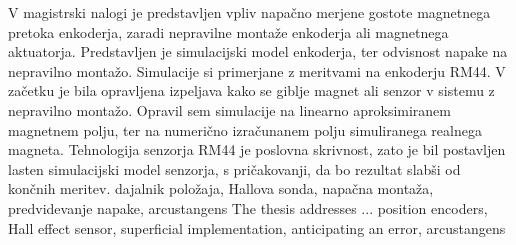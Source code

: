 \documentclass[a4paper,twoside,openright,12pt]{book}
\begin{document}
V magistrski nalogi je predstavljen vpliv napačno merjene gostote magnetnega pretoka enkoderja, zaradi nepravilne montaže enkoderja ali magnetnega aktuatorja. Predstavljen je simulacijski model enkoderja, ter odvisnost napake na nepravilno montažo. Simulacije si primerjane z meritvami na enkoderju RM44. 
V začetku je bila opravljena  izpeljava kako se giblje magnet ali senzor v sistemu z nepravilno montažo\cite{ursic}. Opravil sem simulacije na linearno aproksimiranem magnetnem polju, ter na numerično izračunanem polju simuliranega realnega magneta.
Tehnologija senzorja RM44 je poslovna skrivnost, zato je bil postavljen lasten simulacijski model senzorja, s pričakovanji, da bo rezultat  slabši od končnih meritev.
%
\kljucnebesede  dajalnik položaja, Hallova sonda, napačna montaža, predvidevanje napake, arcustangens
%
%
\abstract
%
The thesis addresses ...
%
\keywords position encoders, Hall effect sensor, superficial implementation, anticipating an error, arcustangens
%
%














\end{document}

